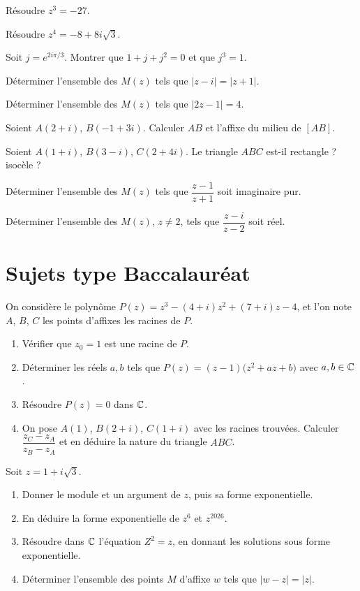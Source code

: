\exo{} Résoudre $z^{3}=-27$.

\exo{} Résoudre $z^{4}=-8+8i\sqrt3$.

\exo{} Soit $j=e^{2i\pi/3}$. Montrer que $1+j+j^{2}=0$ et que $j^{3}=1$.

\exo{} Déterminer l'ensemble des $M(z)$ tels que $|z-i|=|z+1|$.

\exo{} Déterminer l'ensemble des $M(z)$ tels que $|2z-1|=4$.

\exo{} Soient $A(2+i)$, $B(-1+3i)$. Calculer $AB$ et l'affixe du milieu de $[AB]$.

\exo{} Soient $A(1+i)$, $B(3-i)$, $C(2+4i)$. Le triangle $ABC$ est-il rectangle ? isocèle ?

\exo{} Déterminer l'ensemble des $M(z)$ tels que $\dfrac{z-1}{z+1}$ soit imaginaire pur.

\exo{} Déterminer l'ensemble des $M(z)$, $z\neq2$, tels que $\dfrac{z-i}{z-2}$ soit réel.

\section{Sujets type Baccalauréat}

On considère le polynôme $P(z)=z^{3}-(4+i)z^{2}+(7+i)z-4$, et l'on note $A$, $B$, $C$ les points
d'affixes les racines de $P$.
\begin{enumerate}[label=\arabic*)]
\item Vérifier que $z_0=1$ est une racine de $P$.
\item Déterminer les réels $a,b$ tels que $P(z)=(z-1)\big(z^{2}+az+b\big)$ avec $a,b\in\mathbb{C}$.
\item Résoudre $P(z)=0$ dans $\mathbb{C}$.
\item On pose $A(1)$, $B(2+i)$, $C(1+i)$ avec les racines trouvées. Calculer
$\dfrac{z_C-z_A}{z_B-z_A}$ et en déduire la nature du triangle $ABC$.
\end{enumerate}

Soit $z=1+i\sqrt3$.
\begin{enumerate}[label=\arabic*)]
\item Donner le module et un argument de $z$, puis sa forme exponentielle.
\item En déduire la forme exponentielle de $z^{6}$ et $z^{2026}$.
\item Résoudre dans $\mathbb{C}$ l'équation $Z^{2}=z$, en donnant les solutions sous forme exponentielle.
\item Déterminer l'ensemble des points $M$ d'affixe $w$ tels que $|w-z|=|z|$.
\end{enumerate}

